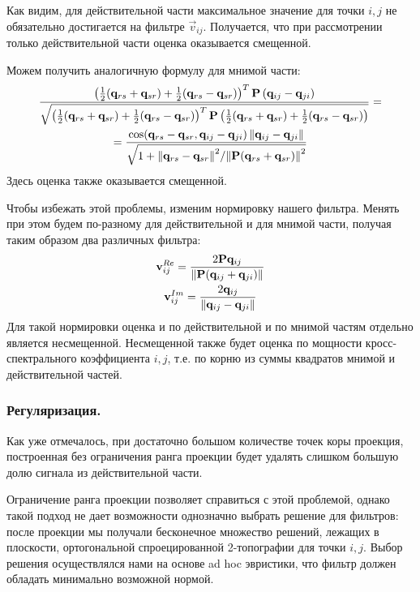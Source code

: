 Как видим, для действительной части максимальное значение для точки $i, j$ не обязательно достигается
на фильтре $\vec{v}_{ij}$.
Получается, что при рассмотрении только действительной части оценка оказывается смещенной.

Можем получить аналогичную формулу для мнимой части:
\begin{multline}
    \frac{\left(\frac{1}{2} (\mathbf{q}_{rs} + \mathbf{q}_{sr}) + \frac{1}{2} (\mathbf{q}_{rs} - \mathbf{q}_{sr})\right)^T\mathbf{P}\left(\mathbf{q}_{ij} - \mathbf{q}_{ji}\right)}
    {\sqrt{\left(\frac{1}{2} (\mathbf{q}_{rs} + \mathbf{q}_{sr}) + \frac{1}{2}
    (\mathbf{q}_{rs} - \mathbf{q}_{sr})\right)^T\mathbf{P}\left(\frac{1}{2} (\mathbf{q}_{rs}
    + \mathbf{q}_{sr}) + \frac{1}{2} (\mathbf{q}_{rs} - \mathbf{q}_{sr})\right)}}  =\\
    = \frac{\cos(\mathbf{q}_{rs} - \mathbf{q}_{sr}, \mathbf{q}_{ij} - \mathbf{q}_{ji}) \left\lVert\mathbf{q}_{ij} - \mathbf{q}_{ji}\right\rVert}
    {\sqrt{1 + {\left\lVert\mathbf{q}_{rs} - \mathbf{q}_{sr}\right\rVert^2}/{\left\lVert\mathbf{P}(\mathbf{q}_{rs} + \mathbf{q}_{sr})\right\rVert^2}}}
\end{multline}
Здесь оценка также оказывается смещенной.

Чтобы избежать этой проблемы, изменим нормировку нашего фильтра. Менять при этом
будем по-разному для действительной и для мнимой части, получая таким образом два различных фильтра:
\begin{gather}
    \mathbf{v}_{ij}^{Re} = \frac{2\mathbf{P}\mathbf{q}_{ij}}{\left\lVert\mathbf{P}(\mathbf{q}_{ij} + \mathbf{q}_{ji})\right\rVert}\\
    \mathbf{v}_{ij}^{Im} = \frac{2\mathbf{q}_{ij}}{\left\lVert\mathbf{q}_{ij} - \mathbf{q}_{ji}\right\rVert}
\end{gather}
Для такой нормировки оценка и по действительной и по мнимой частям отдельно является несмещенной.
Несмещенной также будет оценка по мощности кросс-спектрального коэффициента $i, j$, т.е. по корню
из суммы квадратов мнимой и действительной частей.

\subsubsection{Регуляризация.}
Как уже отмечалось, при достаточно большом количестве точек коры проекция, построенная
без ограничения ранга проекции будет удалять слишком большую долю сигнала из действительной части.

Ограничение ранга проекции позволяет справиться с этой проблемой, однако такой подход
не дает возможности однозначно выбрать решение для фильтров: после проекции мы получали
бесконечное множество решений, лежащих в плоскости, ортогональной спроецированной 2-топографии
для точки $i, j$. Выбор решения осуществлялся нами на основе ad hoc эвристики, что фильтр должен обладать
минимально возможной нормой.

